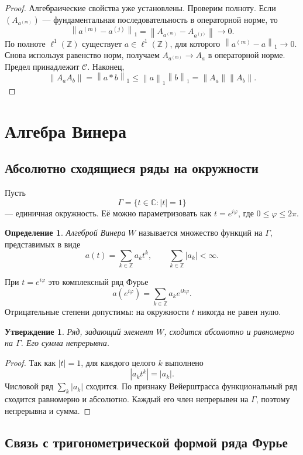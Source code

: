 \documentclass[12pt,a4paper]{article}
\newtheorem{proposition}{Утверждение}
\theoremstyle{definition}
\newtheorem{definition}{Определение}
\theoremstyle{remark}
\newcommand{\CC}{\mathbb{C}}
\newcommand{\ZZ}{\mathbb{Z}}
\newcommand{\norm}[1]{\left\lVert #1\right\rVert}
\newcommand{\Conv}{\mathcal C}
\begin{document}
\begin{proof}
Алгебраические свойства уже установлены. Проверим полноту.
Если $(A_{a^{(m)}})$ --- фундаментальная последовательность в
операторной норме, то
\[
  \norm{a^{(m)}-a^{(j)}}_1
  =\norm{A_{a^{(m)}}-A_{a^{(j)}}}\longrightarrow0.
\]
По полноте $\ell^1(\ZZ)$ существует $a\in\ell^1(\ZZ)$, для которого
$\norm{a^{(m)}-a}_1\to0$. Снова используя равенство норм, получаем
$A_{a^{(m)}}\to A_a$ в операторной норме. Предел принадлежит $\Conv$.
Наконец,
\[
  \norm{A_aA_b}=\norm{a*b}_1\leqslant\norm{a}_1\norm{b}_1
  =\norm{A_a}\norm{A_b}.
\]
\end{proof}

\section{Алгебра Винера}

\subsection{Абсолютно сходящиеся ряды на окружности}

Пусть
\[
  \Gamma=\{t\in\CC:|t|=1\}
\]
--- единичная окружность. Её можно параметризовать как $t=e^{i\varphi}$,
где $0\leqslant\varphi\leqslant2\pi$.

\begin{definition}
\emph{Алгеброй Винера} $W$ называется множество функций на $\Gamma$,
представимых в виде
\[
  a(t)=\sum_{k\in\ZZ}a_kt^k,\qquad
  \sum_{k\in\ZZ}|a_k|<\infty.
\]
\end{definition}

При $t=e^{i\varphi}$ это комплексный ряд Фурье
\[
  a(e^{i\varphi})=\sum_{k\in\ZZ}a_ke^{ik\varphi}.
\]
Отрицательные степени допустимы: на окружности $t$ никогда не равен нулю.

\begin{proposition}
Ряд, задающий элемент $W$, сходится абсолютно и равномерно на $\Gamma$.
Его сумма непрерывна.
\end{proposition}

\begin{proof}
Так как $|t|=1$, для каждого целого $k$ выполнено
\[
  |a_kt^k|=|a_k|.
\]
Числовой ряд $\sum_k|a_k|$ сходится. По признаку Вейерштрасса
функциональный ряд сходится равномерно и абсолютно. Каждый его член
непрерывен на $\Gamma$, поэтому непрерывна и сумма.
\end{proof}

\subsection{Связь с тригонометрической формой ряда Фурье}
\end{document}

